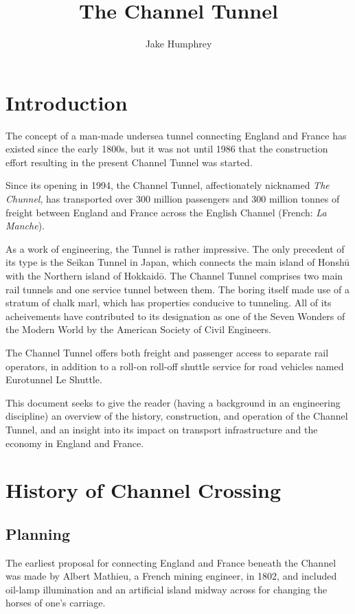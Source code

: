 \documentclass[12pt]{article} %
\title{The Channel Tunnel}
\author{Jake Humphrey}
\date{} %
\begin{document}
\maketitle

\section{Introduction}
\label{sec:intro}

The concept of a man-made undersea tunnel connecting England and France has existed since the early 1800s, but it was not until 1986 that the construction effort resulting in the present Channel Tunnel was started.

Since its opening in 1994, the Channel Tunnel, affectionately nicknamed \emph{The Chunnel}, has transported over 300 million passengers and 300 million tonnes of freight between England and France across the English Channel (French: \emph{La Manche}).

As a work of engineering, the Tunnel is rather impressive. The only precedent of its type is the Seikan Tunnel in Japan, which connects the main island of Honsh\={u} with the Northern island of Hokkaid\={o}. The Channel Tunnel comprises two main rail tunnels and one service tunnel between them. The boring itself made use of a stratum of chalk marl, which has properties conducive to tunneling. All of its acheivements have contributed to its designation as one of the Seven Wonders of the Modern World by the American Society of Civil Engineers.

The Channel Tunnel offers both freight and passenger access to separate rail operators, in addition to a roll-on roll-off shuttle service for road vehicles named Eurotunnel Le Shuttle.

This document seeks to give the reader (having a background in an engineering discipline) an overview of the history, construction, and operation of the Channel Tunnel, and an insight into its impact on transport infrastructure and the economy in England and France.

\section{History of Channel Crossing}
\subsection{Planning}

The earliest proposal for connecting England and France beneath the Channel was made by  Albert Mathieu, a French mining engineer, in 1802, and included oil-lamp illumination and an artificial island midway across for changing the horses of one's carriage.\cite{eurotunnel-build}
\end{document}
